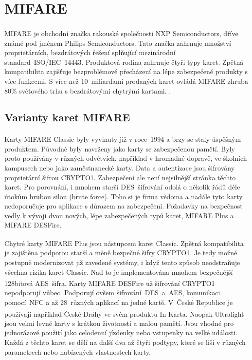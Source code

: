 \section{MIFARE\textsuperscript{\textregistered}}
MIFARE\textsuperscript{\textregistered} je obchodní značka rakouské společnosti NXP Semiconductors, dříve známé pod jménem Philips Semiconductors. Tato značka zahrnuje množství proprietárních, bezdrátových řešení splňující mezinárodní standard~ISO/IEC~14443. Produktová rodina zahrnuje čtyři typy karet. Zpětná kompatibilita zajišťuje bezproblémové přecházení na lépe zabezpečené produkty s více funkcemi. S více než 10~miliardami prodaných karet ovládá MIFARE zhruba 80\% světového trhu s bezdrátovými chytrými kartami. 
\cite{About_MIFARE}\cite{Dismantling_Mifare_Classic}.

\subsection{Varianty karet MIFARE}

Karty MIFARE Classic\textsuperscript{\textregistered} byly vyvinuty již v roce~1994 a brzy se staly úspěšným produktem. Původně byly navrženy jako karty se zabezpečenou pamětí. Byly proto používány v různých odvětvích, například v hromadné dopravě, ve školních kampusech nebo jako zaměstnanecké karty. Data a autentizace jsou šifrovány proprietární šifrou CRYPTO1. Zabezpečení ale není nejsilnější stránka těchto karet. Pro porovnání, i mnohem starší DES~šifrování odolá o několik řádů déle útokům hrubou silou (brute force). Toho si je firma vědoma a nadále tyto karty nedoporučuje pro aplikace s důrazem na zabezpečení. Požadavky na bezpečnost vedly k vývoji dvou nových, lépe zabezpečených typů karet, MIFARE Plus a MIFARE DESFire\cite{Mifare_Classic_story}\cite{MIFARE_Classic_Official_about}. 
\par
Chytré karty MIFARE Plus\textsuperscript{\textregistered} jsou nástupcem karet Classic. Zpětná kompatibilita je zajištěna podporou starší a méně bezpečné šifry CRYPTO1. Je tedy možné postupně modernizovat již zavedené systémy, i když tento způsob neodstraňuje všechna rizika karet Classic. Nad to je implementována mnohem bezpečnější 128bitová AES~šifra\cite{MIFARE_Plus_Official}. Karty MIFARE DESFire\textsuperscript{\textregistered} už šifrování CRYPTO1 nepodporují vůbec. Podporují ovšem šifrování~DES~a~AES, komunikaci pomocí~NFC a až 28~různých aplikací na jedné kartě\cite{MIFARE_DESFire_Official}. V~České Republice je používají například České Dráhy ve svém produktu In Karta\cite{Ceske_Drahy_Podminky_InKarta}. Naopak Ultralight\textsuperscript{\textregistered} jsou velmi levné karty s krátkou životností a malou pamětí. Jsou vhodné pro jednorázové použití jako celodenní jízdenky nebo vstupenky na velké události\cite{MIFARE_Ultralight_Official}. Každá z těchto karet se dělí na další dva až čtyři podtypy, které se liší v různých parametrech nebo nabízených vlastnostech karty.

